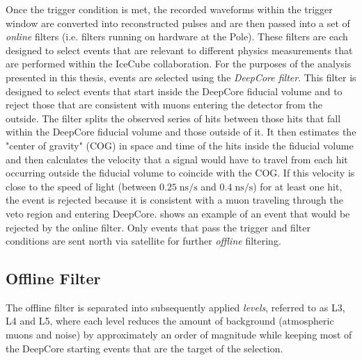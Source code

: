 Once the trigger condition is met, the recorded waveforms within the trigger window are converted into reconstructed pulses and are then passed into a set of \emph{online} filters (i.e. filters running on hardware at the Pole). These filters are each designed to select events that are relevant to different physics measurements that are performed within the IceCube collaboration. For the purposes of the analysis presented in this thesis, events are selected using the \emph{DeepCore filter}. This filter is designed to select events that start inside the DeepCore fiducial volume and to reject those that are consistent with muons entering the detector from the outside. The filter splits the observed series of hits between those hits that fall within the DeepCore fiducial volume and those outside of it. It then estimates the "center of gravity" (COG) in space and time of the hits inside the fiducial volume and then calculates the velocity that a signal would have to travel from each hit occurring outside the fiducial volume to coincide with the COG. If this velocity is close to the speed of light (between $0.25\;\mathrm{ns/s}$ and $0.4\;\mathrm{ns/s}$) for at least one hit, the event is rejected because it is consistent with a muon traveling through the veto region and entering DeepCore.  shows an example of an event that would be rejected by the online filter. Only events that pass the trigger and filter conditions are sent north via satellite for further \emph{offline} filtering.

\subsection{Offline Filter}
\label{sec:offline-filter}
The offline filter is separated into subsequently applied \emph{levels}, referred to as L3, L4 and L5, where each level reduces the amount of background (atmospheric muons and noise) by approximately an order of magnitude while keeping most of the DeepCore starting events that are the target of the selection.

